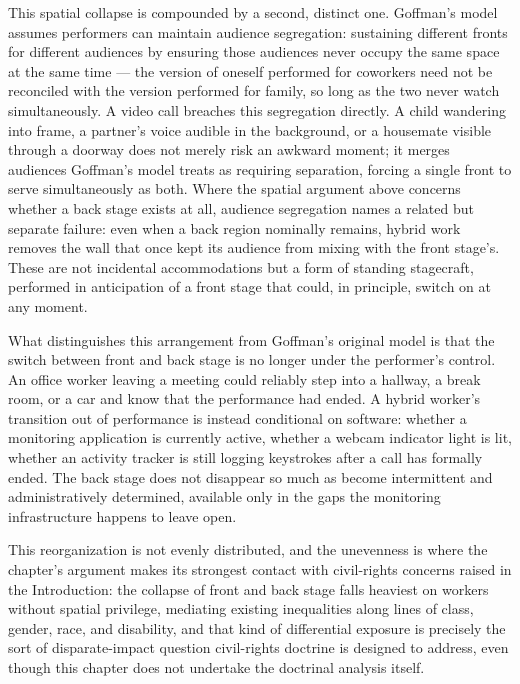 \documentclass[10pt]{article}
\begin{document}
This spatial collapse is compounded by a second, distinct one. Goffman's model assumes performers can maintain audience segregation: sustaining different fronts for different audiences by ensuring those audiences never occupy the same space at the same time --- the version of oneself performed for coworkers need not be reconciled with the version performed for family, so long as the two never watch simultaneously. A video call breaches this segregation directly. A child wandering into frame, a partner's voice audible in the background, or a housemate visible through a doorway does not merely risk an awkward moment; it merges audiences Goffman's model treats as requiring separation, forcing a single front to serve simultaneously as both. Where the spatial argument above concerns whether a back stage exists at all, audience segregation names a related but separate failure: even when a back region nominally remains, hybrid work removes the wall that once kept its audience from mixing with the front stage's. These are not incidental accommodations but a form of standing stagecraft, performed in anticipation of a front stage that could, in principle, switch on at any moment.

What distinguishes this arrangement from Goffman's original model is that the switch between front and back stage is no longer under the performer's control. An office worker leaving a meeting could reliably step into a hallway, a break room, or a car and know that the performance had ended. A hybrid worker's transition out of performance is instead conditional on software: whether a monitoring application is currently active, whether a webcam indicator light is lit, whether an activity tracker is still logging keystrokes after a call has formally ended. The back stage does not disappear so much as become intermittent and administratively determined, available only in the gaps the monitoring infrastructure happens to leave open.

This reorganization is not evenly distributed, and the unevenness is where the chapter's argument makes its strongest contact with civil-rights concerns raised in the Introduction: the collapse of front and back stage falls heaviest on workers without spatial privilege, mediating existing inequalities along lines of class, gender, race, and disability, and that kind of differential exposure is precisely the sort of disparate-impact question civil-rights doctrine is designed to address, even though this chapter does not undertake the doctrinal analysis itself.
\end{document}
